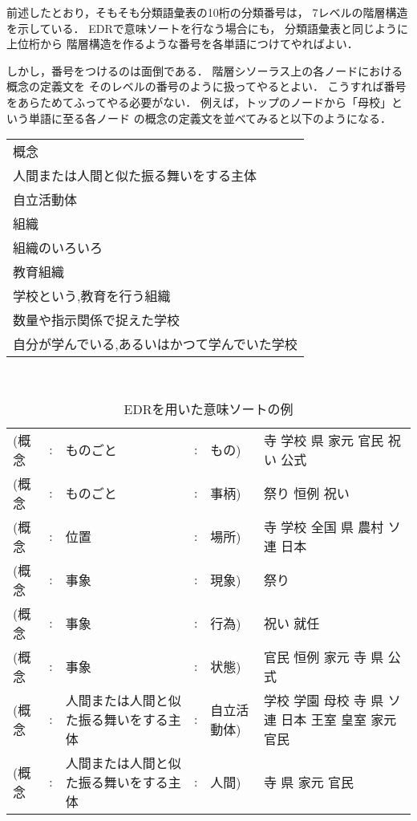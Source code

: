 前述したとおり，そもそも分類語彙表の10桁の分類番号は，
7レベルの階層構造を示している．
EDRで意味ソートを行なう場合にも，
分類語彙表と同じように上位桁から
階層構造を作るような番号を各単語につけてやればよい．

しかし，番号をつけるのは面倒である．
階層シソーラス上の各ノードにおける概念の定義文を
そのレベルの番号のように扱ってやるとよい．
こうすれば番号をあらためてふってやる必要がない．
例えば，トップのノードから「母校」という単語に至る各ノード
の概念の定義文を並べてみると以下のようになる．\\

{\small\renewcommand{\arraystretch}{}
\begin{tabular}[c]{|l|}\hline
概念\\
人間または人間と似た振る舞いをする主体\\
自立活動体\\
組織\\
組織のいろいろ\\
教育組織\\
学校という,教育を行う組織\\
数量や指示関係で捉えた学校\\
自分が学んでいる,あるいはかつて学んでいた学校\\\hline
\end{tabular}\\
}

\begin{table*}[t]
  \caption{EDRを用いた意味ソートの例}
  \label{tab:EDR_last_rei}
  \begin{center}
\footnotesize\renewcommand{\arraystretch}{}
\begin{tabular}[c]{|l@{ }c@{ }l@{ }c@{ }ll|}\hline
(概念 & : & ものごと & : & もの) & 寺 学校 県 家元 官民 祝い 公式\\
(概念 & : & ものごと & : & 事柄) & 祭り 恒例 祝い\\
(概念 & : & 位置 & : & 場所) & 寺 学校 全国 県 農村 ソ連 日本\\
(概念 & : & 事象 & : & 現象) & 祭り\\
(概念 & : & 事象 & : & 行為) & 祝い 就任\\
(概念 & : & 事象 & : & 状態) & 官民 恒例 家元 寺 県 公式\\
(概念 & : & 人間または人間と似た振る舞いをする主体 & : & 自立活動体) & 学校 学園 母校 寺 県 ソ連 日本 王室 皇室 家元 官民\\
(概念 & : & 人間または人間と似た振る舞いをする主体 & : & 人間) & 寺 県 家元 官民\\\hline
\end{tabular}
\end{center}
\end{table*}

